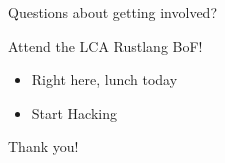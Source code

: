 \documentclass[100pt]{beamer}
\begin{document}
\begin{frame}
    Questions about getting involved?
\end{frame}

\begin{frame}
    Attend the LCA Rustlang BoF!
    \begin{itemize}
        \item Right here, lunch today
        \item Start Hacking
    \end{itemize}
\end{frame}

\begin{frame}

Thank you!

\end{frame}
%
%
\end{document}
